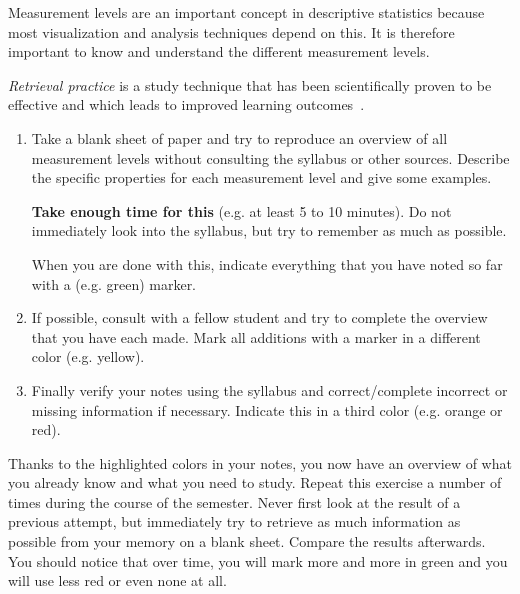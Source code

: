 \begin{exercise}
    \label{ex:retrieval-practice-meetniveaus}
    Measurement levels are an important concept in descriptive statistics because most visualization and analysis techniques depend on this. It is therefore important to know and understand the different measurement levels.
    
    \emph{Retrieval practice} is a study technique that has been scientifically proven to be effective and which leads to improved learning outcomes~\parencite{RoedigerKarpicke2006}.
    
    \begin{enumerate}[label=\alph*.]
        \item Take a blank sheet of paper and try to reproduce an overview of all measurement levels without consulting the syllabus or other sources. Describe the specific properties for each measurement level and give some examples.
        
        \textbf{Take enough time for this} (e.g. at least 5 to 10 minutes). Do not immediately look into the syllabus, but try to remember as much as possible.
        
        When you are done with this, indicate everything that you have noted so far with a (e.g. green) marker.
        
        \item If possible, consult with a fellow student and try to complete the overview that you have each made. Mark all additions with a marker in a different color (e.g. yellow).
        
        \item Finally verify your notes using the syllabus and correct/complete incorrect or missing information if necessary. Indicate this in a third color (e.g. orange or red).
    \end{enumerate}
    
    Thanks to the highlighted colors in your notes, you now have an overview of what you already know and what you need to study. 
    Repeat this exercise a number of times during the course of the semester. 
    Never first look at the result of a previous attempt, but immediately try to retrieve as much information as possible from your memory on a blank sheet. Compare the results afterwards. 
    You should notice that over time, you will mark more and more in green and you will use less red or even none at all.
\end{exercise}


